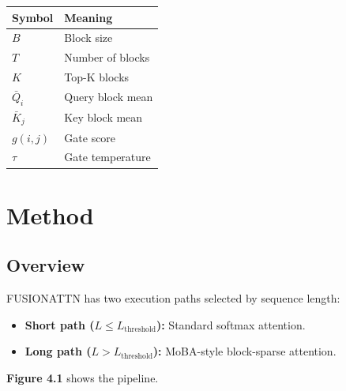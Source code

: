 \begin{table}[H]
\centering
\small
\begin{tabular}{ll}
\toprule
\textbf{Symbol} & \textbf{Meaning} \\
\midrule
$B$ & Block size \\
$T$ & Number of blocks \\
$K$ & Top-K blocks \\
$\bar{Q}_i$ & Query block mean \\
$\bar{K}_j$ & Key block mean \\
$g(i, j)$ & Gate score \\
$\tau$ & Gate temperature \\
\bottomrule
\end{tabular}
\end{table}



\section{Method}

\subsection{Overview}

FUSIONATTN has two execution paths selected by sequence length:

\begin{itemize}
\item \textbf{Short path ($L \leq L_\text{threshold}$):} Standard softmax attention.
\item \textbf{Long path ($L > L_\text{threshold}$):} MoBA-style block-sparse attention.

\end{itemize}
\textbf{Figure 4.1} shows the pipeline.

